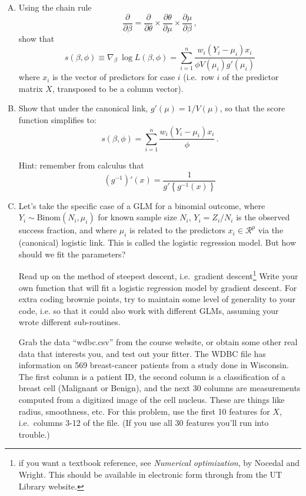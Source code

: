 \documentclass{mynotes}
\begin{document}
\begin{enumerate}[(A)]

\item Using the chain rule
$$
\frac{\partial}{\partial \beta} = \frac{\partial}{\partial \theta} \times \frac{\partial \theta}{\partial \mu } \times \frac{\partial \mu}{\partial \beta} \, ,
$$
show that 
$$
s(\beta, \phi) \equiv \nabla_\beta \  \log L(\beta, \phi)  = \sum_{i=1}^n \frac{w_i(Y_i - \mu_i) x_i}{ \phi V(\mu_i) g'(\mu_i)}
$$
where $x_i$ is the vector of predictors for case $i$ (i.e.~row $i$ of the predictor matrix $X$, transposed to be a column vector). 

\item Show that under the canonical link, $g'(\mu) = 1/V(\mu)$, so that the score function simplifies to:  
$$
s(\beta, \phi) = \sum_{i=1}^n \frac{w_i(Y_i - \mu_i) x_i}{ \phi} \, .
$$

Hint: remember from calculus that
$$
(g^{-1})'(x) = \frac{1}{g'\left\{ g^{-1}(x) \right\}}
$$


\item Let's take the specific case of a GLM for a binomial outcome, where $Y_i \sim \mbox{Binom}(N_i, \mu_i)$ for known sample size $N_i$, $Y_i = Z_i/N_i$ is the observed success fraction, and where $\mu_i$ is related to the predictors $x_i \in \mathcal{R}^p$ via the (canonical) logistic link.  This is called the logistic regression model.  But how should we fit the parameters?

Read up on the method of steepest descent, i.e.~gradient descent\footnote{if you want a textbook reference, see \textit{Numerical optimization}, by Nocedal and Wright. This should be available in electronic form through from the UT Library website.}  Write your own function that will fit a logistic regression model by gradient descent.  For extra coding brownie points, try to maintain some level of generality to your code, i.e. so that it could also work with different GLMs, assuming your wrote different sub-routines.  

Grab the data ``wdbc.csv'' from the course website, or obtain some other real data that interests you, and test out your fitter.  The WDBC file has information on 569 breast-cancer patients from a study done in Wisconsin.  The first column is a patient ID, the second column is a classification of a breast cell (Malignant or Benign), and the next 30 columns are measurements computed from a digitized image of the cell nucleus.  These are things like radius, smoothness, etc.  For this problem, use the first 10 features for $X$, i.e.~columns 3-12 of the file.  (If you use all 30 features you'll run into trouble.) 


\end{enumerate}
\end{document}
